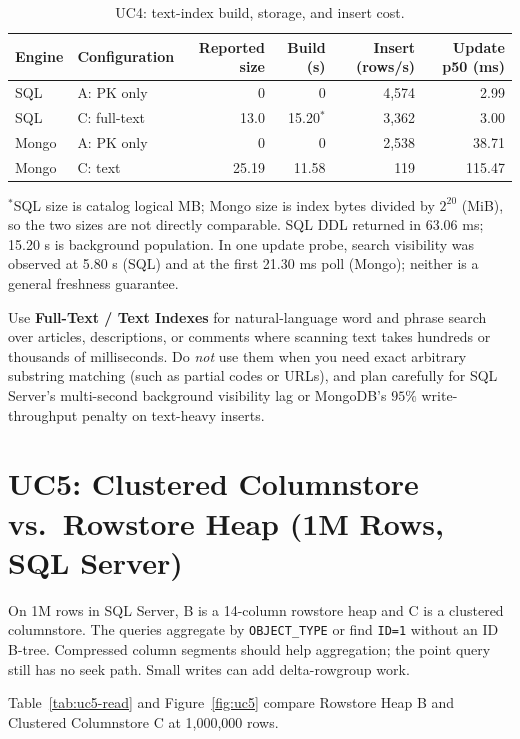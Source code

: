 \begin{table}[H]
\centering\small
\caption{UC4: text-index build, storage, and insert cost.}
\label{tab:uc4-tradeoff}
\begin{tabular}{@{}l l r r r r@{}}
\toprule
Engine & Configuration & Reported size & Build (s) & Insert (rows/s) & Update p50 (ms)\\
\midrule
SQL & A: PK only & 0 & 0 & 4,574 & 2.99\\
SQL & C: full-text & 13.0 & 15.20$^*$ & 3,362 & 3.00\\
Mongo & A: PK only & 0 & 0 & 2,538 & 38.71\\
Mongo & C: text & 25.19 & 11.58 & 119 & 115.47\\
\bottomrule
\end{tabular}
\par\smallskip\scriptsize\raggedright $^*$SQL size is catalog logical MB; Mongo size is index bytes divided by $2^{20}$ (MiB), so the two sizes are not directly comparable. SQL DDL returned in 63.06 ms; 15.20 s is background population. In one update probe, search visibility was observed at 5.80 s (SQL) and at the first 21.30 ms poll (Mongo); neither is a general freshness guarantee.\par
\end{table}

Use \textbf{Full-Text / Text Indexes} for natural-language word and phrase search over articles, descriptions, or comments where scanning text takes hundreds or thousands of milliseconds. Do \emph{not} use them when you need exact arbitrary substring matching (such as partial codes or URLs), and plan carefully for SQL Server's multi-second background visibility lag or MongoDB's $95\%$ write-throughput penalty on text-heavy inserts.

\FloatBarrier
\section{UC5: Clustered Columnstore vs.\ Rowstore Heap (1M Rows, SQL Server)}

On 1M rows in SQL Server, B is a 14-column rowstore heap and C is a clustered columnstore. The queries aggregate by \texttt{OBJECT\_TYPE} or find \texttt{ID=1} without an ID B-tree. Compressed column segments should help aggregation; the point query still has no seek path. Small writes can add delta-rowgroup work.

Table~\ref{tab:uc5-read} and Figure~\ref{fig:uc5} compare Rowstore Heap B and Clustered Columnstore C at 1,000,000 rows.

